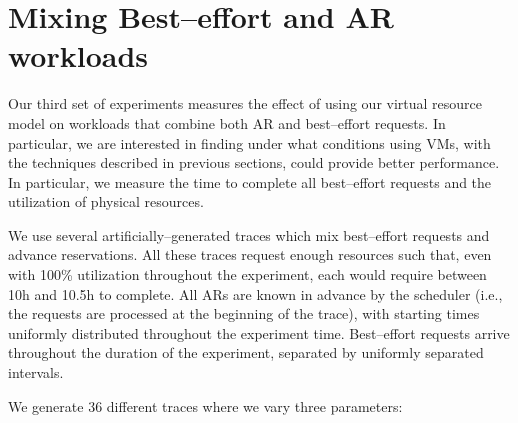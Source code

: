 \section{Mixing Best--effort and AR workloads}

Our third set of experiments measures the effect of using our virtual resource model on workloads that combine both AR and best--effort requests. In particular, we are interested in finding under what conditions using VMs, with the techniques described in previous sections, could provide better performance. In particular, we measure the time to complete all best--effort requests and the utilization of physical resources.

We use several artificially--generated traces which mix best--effort requests and advance reservations. All these traces request enough resources such that, even with 100\% utilization throughout the experiment, each would require between 10h and 10.5h to complete. All ARs are known in advance by the scheduler (i.e., the requests are processed at the beginning of the trace), with starting times uniformly distributed throughout the experiment time. Best--effort requests arrive throughout the duration of the experiment, separated by uniformly separated intervals. 

We generate 36 different traces where we vary three parameters:

